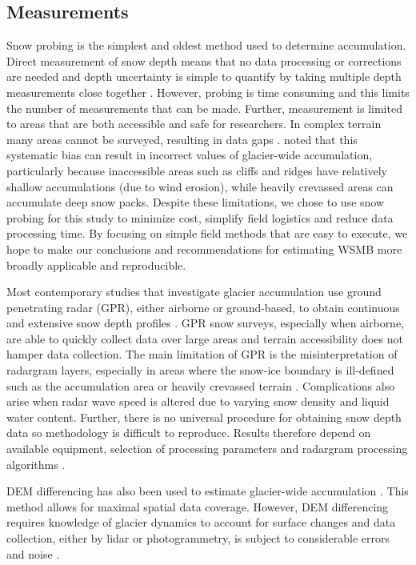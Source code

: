\documentclass[review,oneside, letterpaper]{igs}
\begin{document}
\subsection{Measurements}

Snow probing is the simplest and oldest method used to determine accumulation. Direct measurement of snow depth means that no data processing or corrections are needed and depth uncertainty is simple to quantify by taking multiple depth measurements close together \citep{Sold2013}. However, probing is time consuming and this limits the number of measurements that can be made. Further, measurement is limited to areas that are both accessible and safe for researchers. In complex terrain many areas cannot be surveyed, resulting in data gaps \citep{Deems2006, Sold2014}. \cite{Sold2013} noted that this systematic bias can result in incorrect values of glacier-wide accumulation, particularly because inaccessible areas such as cliffs and ridges have relatively shallow accumulations (due to wind erosion), while heavily crevassed areas can accumulate deep snow packs. Despite these limitations, we chose to use snow probing for this study to minimize cost, simplify field logistics and reduce data processing time. By focusing on simple field methods that are easy to execute, we hope to make our conclusions and recommendations for estimating WSMB more broadly applicable and reproducible.
 
Most contemporary studies that investigate glacier accumulation use ground penetrating radar (GPR), either airborne or ground-based, to obtain continuous and extensive snow depth profiles \citep[e.g.][]{Winther1998,Machguth2006, Gusmeroli2014, McGrath2015}. GPR snow surveys, especially when airborne, are able to quickly collect data over large areas and terrain accessibility does not hamper data collection. The main limitation of GPR is the misinterpretation of radargram layers, especially in areas where the snow-ice boundary is ill-defined such as the accumulation area or heavily crevassed terrain \citep{Machguth2006, Gusmeroli2014, McGrath2015}. Complications also arise when radar wave speed is altered due to varying snow density and liquid water content. Further, there is no universal procedure for obtaining snow depth data so methodology is difficult to reproduce.  Results therefore depend on available equipment, selection of processing parameters and radargram processing algorithms \citep{Sold2013}.

DEM differencing has also been used to estimate glacier-wide accumulation \citep{Deems2006,Nolan2015}. This method allows for maximal spatial data coverage. However, DEM differencing requires knowledge of glacier dynamics to account for surface changes and data collection, either by lidar or photogrammetry, is subject to considerable errors and noise \citep{Deems2006,Nolan2015}. 
\end{document}
